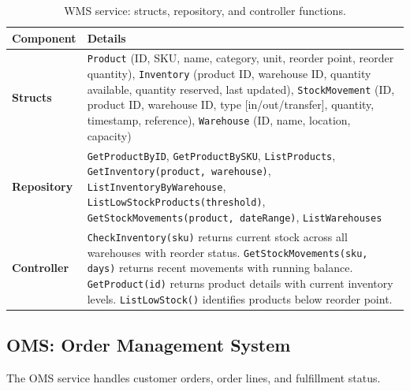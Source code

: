 \documentclass[12pt,a4paper]{report}
\begin{document}
\begin{table}[H]
\centering\small
\caption{WMS service: structs, repository, and controller functions.}
\begin{tabularx}{\textwidth}{@{} l X @{}}
\toprule
\textbf{Component} & \textbf{Details} \\
\midrule
\textbf{Structs} &
    \texttt{Product} (ID, SKU, name, category, unit, reorder point, reorder quantity),
    \texttt{Inventory} (product ID, warehouse ID, quantity available, quantity reserved, last updated),
    \texttt{StockMovement} (ID, product ID, warehouse ID, type [in/out/transfer], quantity, timestamp, reference),
    \texttt{Warehouse} (ID, name, location, capacity) \\
\textbf{Repository} &
    \texttt{GetProductByID}, \texttt{GetProductBySKU}, \texttt{ListProducts},
    \texttt{GetInventory(product, warehouse)}, \texttt{ListInventoryByWarehouse},
    \texttt{ListLowStockProducts(threshold)}, \texttt{GetStockMovements(product, dateRange)},
    \texttt{ListWarehouses} \\
\textbf{Controller} &
    \texttt{CheckInventory(sku)} returns current stock across all warehouses with reorder status.
    \texttt{GetStockMovements(sku, days)} returns recent movements with running balance.
    \texttt{GetProduct(id)} returns product details with current inventory levels.
    \texttt{ListLowStock()} identifies products below reorder point. \\
\bottomrule
\end{tabularx}
\end{table}

\subsection{OMS: Order Management System}

The OMS service handles customer orders, order lines, and fulfillment status.
\end{document}

